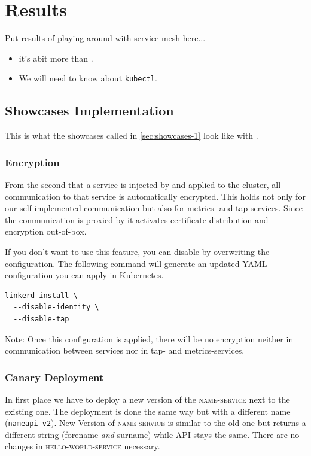 \section{Results}

Put results of playing around with service mesh here...

\begin{itemize}
	\item it's abit more than \linkerd{}.
	\item We will need to know about \lstinline|kubectl|.
\end{itemize}

\subsection{Showcases Implementation}
This is what the showcases called in \autoref{sec:showcases-1} look like with \linkerd{}.

\subsubsection{Encryption}
From the second that a service is injected by \linkerd{} and applied to the cluster, all communication to that service is automatically encrypted.
This holds not only for our self-implemented communication but also for metrics- and tap-services.
Since the communication is proxied by \linkerd{} it activates certificate distribution and encryption out-of-box.

If you don't want to use this feature, you can disable by overwriting the \linkerd{} configuration.
The following command will generate an updated YAML-configuration you can apply in Kubernetes.
\begin{lstlisting}
linkerd install \
  --disable-identity \
  --disable-tap
\end{lstlisting}
Note: Once this configuration is applied, there will be no encryption neither in communication between services nor in tap- and metrics-services.

\subsubsection{Canary Deployment}
\label{sec:canary-result}
In first place we have to deploy a new version of the \textsc{name-service} next to the existing one.
The deployment is done the same way but with a different name (\lstinline|nameapi-v2|).
New Version of \textsc{name-service} is similar to the old one but returns a different string (forename \textit{and} surname) while API stays the same.
There are no changes in \textsc{hello-world-service} necessary.

